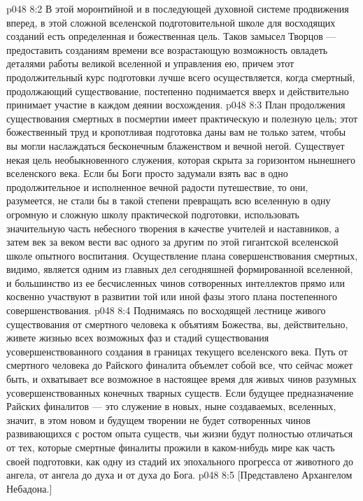 \vs p048 8:2 В этой моронтийной и в последующей духовной системе продвижения вперед, в этой сложной вселенской подготовительной школе для восходящих созданий есть определенная и божественная цель. Таков замысел Творцов --- предоставить созданиям времени все возрастающую возможность овладеть деталями работы великой вселенной и управления ею, причем этот продолжительный курс подготовки лучше всего осуществляется, когда смертный, продолжающий существование, постепенно поднимается вверх и действительно принимает участие в каждом деянии восхождения.
\vs p048 8:3 План продолжения существования смертных в посмертии имеет практическую и полезную цель; этот божественный труд и кропотливая подготовка даны вам не только затем, чтобы вы могли наслаждаться бесконечным блаженством и вечной негой. Существует некая цель необыкновенного служения, которая скрыта за горизонтом нынешнего вселенского века. Если бы Боги просто задумали взять вас в одно продолжительное и исполненное вечной радости путешествие, то они, разумеется, не стали бы в такой степени превращать всю вселенную в одну огромную и сложную школу практической подготовки, использовать значительную часть небесного творения в качестве учителей и наставников, а затем век за веком вести вас одного за другим по этой гигантской вселенской школе опытного воспитания. Осуществление плана совершенствования смертных, видимо, является одним из главных дел сегодняшней формированной вселенной, и большинство из ее бесчисленных чинов сотворенных интеллектов прямо или косвенно участвуют в развитии той или иной фазы этого плана постепенного совершенствования.
\vs p048 8:4 Поднимаясь по восходящей лестнице живого существования от смертного человека к объятиям Божества, вы, действительно, живете жизнью всех возможных фаз и стадий существования усовершенствованного создания в границах текущего вселенского века. Путь от смертного человека до Райского финалита объемлет собой все, что сейчас может быть, и охватывает все возможное в настоящее время для живых чинов разумных усовершенствованных конечных тварных существ. Если будущее предназначение Райских финалитов --- это служение в новых, ныне создаваемых, вселенных, значит, в этом новом и будущем творении не будет сотворенных чинов развивающихся с ростом опыта существ, чьи жизни будут полностью отличаться от тех, которые смертные финалиты прожили в каком\hyp{}нибудь мире как часть своей подготовки, как одну из стадий их эпохального прогресса от животного до ангела, от ангела до духа и от духа до Бога.
\vsetoff
\vs p048 8:5 [Представлено Архангелом Небадона.]
